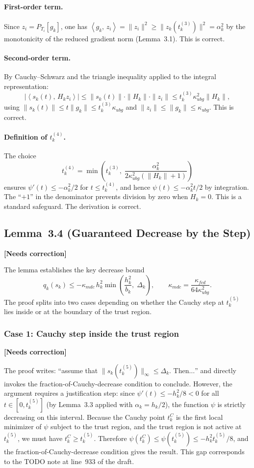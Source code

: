 \documentclass[11pt]{article}
\newcommand{\inner}[2]{\left\langle #1,\, #2 \right\rangle}
\newcommand{\proj}[2]{P_{#1}\!\left[#2\right]}
\newcommand{\statuserr}{\textcolor{issuecolor}{\textbf{[Needs correction]}}}
\theoremstyle{plain}
\begin{document}
\paragraph{First-order term.} Since $z_i = \proj{T_i}{g_k}$, one has $\inner{g_k}{z_i} = \|z_i\|^2 \ge \|z_k(t_k^{(3)})\|^2 = \alpha_k^2$ by the monotonicity of the reduced gradient norm (Lemma~3.1). This is correct.

\paragraph{Second-order term.} By Cauchy--Schwarz and the triangle inequality applied to the integral representation:
\[
|\inner{s_k(t)}{H_kz_i}| \le \|s_k(t)\|\cdot\|H_k\|\cdot\|z_i\| \le t_k^{(3)}\kappa_{ubg}^2\|H_k\|,
\]
using $\|s_k(t)\| \le t\|g_k\| \le t_k^{(3)}\kappa_{ubg}$ and $\|z_i\| \le \|g_k\| \le \kappa_{ubg}$. This is correct.

\paragraph{Definition of $t_k^{(4)}$.} The choice
\[
t_k^{(4)} = \min\!\left(t_k^{(3)},\;\frac{\alpha_k^2}{2\kappa_{ubg}^2(\|H_k\|+1)}\right)
\]
ensures $\psi'(t) \le -\alpha_k^2/2$ for $t \le t_k^{(4)}$, and hence $\psi(t) \le -\alpha_k^2 t/2$ by integration. The ``$+1$'' in the denominator prevents division by zero when $H_k = 0$. This is a standard safeguard. The derivation is correct.

\subsection{Lemma~3.4 (Guaranteed Decrease by the Step)}\label{subsec:lemma34}
\statuserr

The lemma establishes the key decrease bound
\[
q_k(s_k) \le -\kappa_{mdc}\,h_k^2\min\!\left(\frac{h_k^2}{b_k},\;\Delta_k\right), \qquad \kappa_{mdc} = \frac{\kappa_{fcd}}{64\kappa_{ubg}^2}.
\]
The proof splits into two cases depending on whether the Cauchy step at $t_k^{(5)}$ lies inside or at the boundary of the trust region.

\subsubsection{Case 1: Cauchy step inside the trust region}
\statuserr

The proof writes: ``assume that $\|s_k(t_k^{(5)})\|_\infty \le \Delta_k$. Then$\ldots$'' and directly invokes the fraction-of-Cauchy-decrease condition to conclude. However, the argument requires a justification step: since $\psi'(t) \le -h_k^2/8 < 0$ for all $t \in [0, t_k^{(5)}]$ (by Lemma~3.3 applied with $\alpha_k = h_k/2$), the function $\psi$ is strictly decreasing on this interval. Because the Cauchy point $t_k^C$ is the first local minimizer of $\psi$ subject to the trust region, and the trust region is not active at $t_k^{(5)}$, we must have $t_k^C \ge t_k^{(5)}$. Therefore $\psi(t_k^C) \le \psi(t_k^{(5)}) \le -h_k^2 t_k^{(5)}/8$, and the fraction-of-Cauchy-decrease condition gives the result. This gap corresponds to the TODO note at line~933 of the draft.
\end{document}
